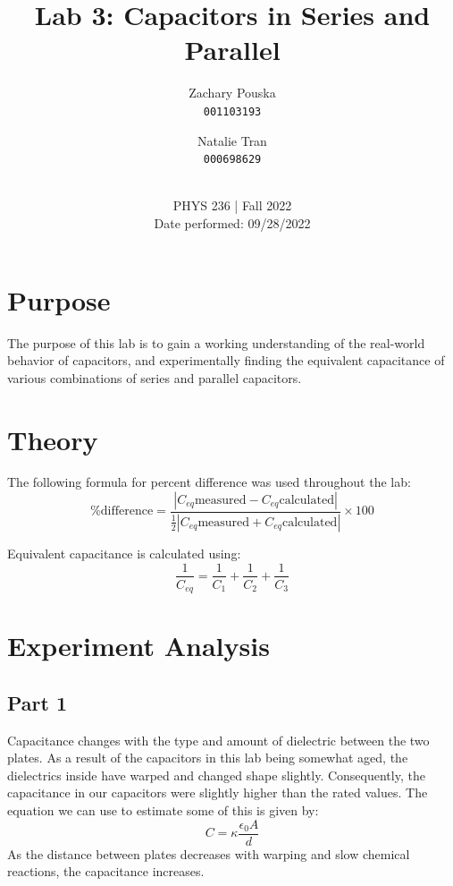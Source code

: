 \documentclass[titlepage]{article}
\begin{document}
\title{\textbf{Lab 3: Capacitors in Series and Parallel}}
\author{
    Zachary Pouska\\
    \texttt{001103193}\\
    \and
    Natalie Tran \\ 
    \texttt{000698629}\\ \\
} 

\date{PHYS 236 | Fall 2022\\
Date performed: 09/28/2022}


	\maketitle



	\section{Purpose}
    The purpose of this lab is to gain a working understanding of the real-world behavior of capacitors, and experimentally finding the equivalent capacitance of various combinations of series and parallel capacitors.

	\section{Theory}	

    The following formula for percent difference was used throughout the lab: $$\text{\% difference} = \frac{|C_{eq}\text{measured} - C_{eq}\text{calculated} |}{\frac{1}{2} |C_{eq}\text{measured} + C_{eq}\text{calculated}|} \times 100$$

    Equivalent capacitance is calculated using: 
    $$\frac{1}{C_{eq}} = \frac{1}{C_1}+\frac{1}{C_2} + \frac{1}{C_3}
    $$




	\section{Experiment Analysis}
   	\subsection{Part 1} 
    Capacitance changes with the type and amount of dielectric between the two plates. As a result of the capacitors in this lab being somewhat aged, the dielectrics inside have warped and changed shape slightly. Consequently, the capacitance in our capacitors were slightly higher than the rated values. The equation we can use to estimate some of this is given by: $$ C=\kappa \frac{\epsilon _0 A}{d}$$
    As the distance between plates decreases with warping and slow chemical reactions, the capacitance increases.
\end{document}
